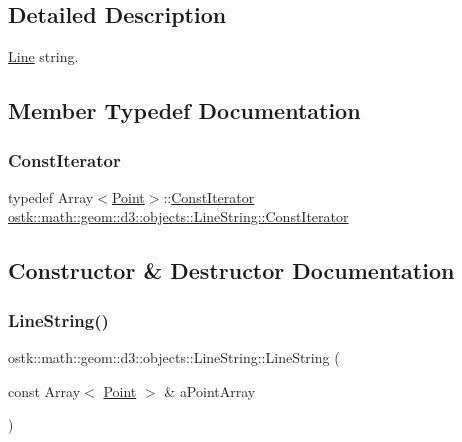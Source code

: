 \subsection{Detailed Description}
\hyperlink{classostk_1_1math_1_1geom_1_1d3_1_1objects_1_1_line}{Line} string. 

\subsection{Member Typedef Documentation}
\mbox{\label{classostk_1_1math_1_1geom_1_1d3_1_1objects_1_1_line_string_a5d184ce7a4ef5613a621f9b628e56de8}} 
\subsubsection{\texorpdfstring{Const\+Iterator}{ConstIterator}}
{\footnotesize\ttfamily typedef Array$<$\hyperlink{classostk_1_1math_1_1geom_1_1d3_1_1objects_1_1_point}{Point}$>$\+::\hyperlink{classostk_1_1math_1_1geom_1_1d3_1_1objects_1_1_line_string_a5d184ce7a4ef5613a621f9b628e56de8}{Const\+Iterator} \hyperlink{classostk_1_1math_1_1geom_1_1d3_1_1objects_1_1_line_string_a5d184ce7a4ef5613a621f9b628e56de8}{ostk\+::math\+::geom\+::d3\+::objects\+::\+Line\+String\+::\+Const\+Iterator}}



\subsection{Constructor \& Destructor Documentation}
\mbox{\label{classostk_1_1math_1_1geom_1_1d3_1_1objects_1_1_line_string_a711ebaa7353366ba729bf1ed648fd5a4}} 
\subsubsection{\texorpdfstring{Line\+String()}{LineString()}}
{\footnotesize\ttfamily ostk\+::math\+::geom\+::d3\+::objects\+::\+Line\+String\+::\+Line\+String (\begin{DoxyParamCaption}\item[{const Array$<$ \hyperlink{classostk_1_1math_1_1geom_1_1d3_1_1objects_1_1_point}{Point} $>$ \&}]{a\+Point\+Array }\end{DoxyParamCaption})}



